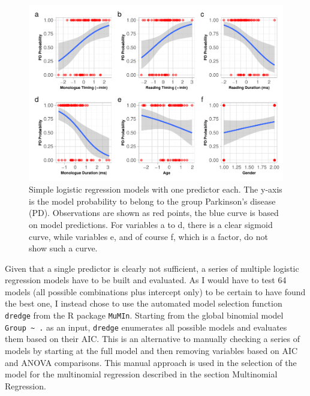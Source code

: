 \documentclass[
  english,
  doc,floatsintext]{apa6}
\begin{document}
\begin{figure}

{\centering \includegraphics{dap_report_anja_probst_files/figure-latex/simple-logistic-regression-1} 

}

\caption{Simple logistic regression models with one predictor each. The y-axis is the model probability to belong to the group Parkinson's disease (PD). Observations are shown as red points, the blue curve is based on model predictions. For variables a to d, there is a clear sigmoid curve, while variables e, and of course f, which is a factor, do not show such a curve.}\label{fig:simple-logistic-regression}
\end{figure}

Given that a single predictor is clearly not sufficient, a series of multiple logistic regression models
have to be built and evaluated. As I would have to test 64 models (all possible combinations plus
intercept only) to be certain to have found the best one, I instead chose to use the automated model
selection function \texttt{dredge} from the R package \texttt{MuMIn}. Starting from the global binomial model
\texttt{Group\ \textasciitilde{}\ .} as an input, \texttt{dredge} enumerates all possible models and evaluates them based on their AIC.
This is an alternative to manually checking a series of models by starting at the full model and then
removing variables based on AIC and ANOVA comparisons. This manual approach is used in the selection of
the model for the multinomial regression described in the section Multinomial Regression.
\end{document}
